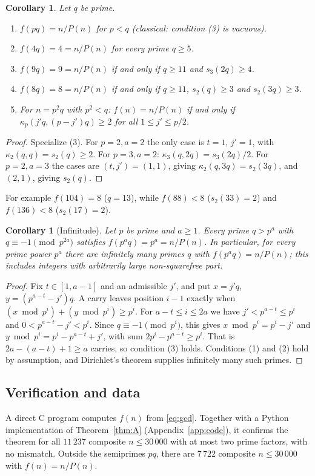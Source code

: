 \documentclass[11pt,a4paper]{article}
\newtheorem{corollary}[theorem]{Corollary}
\theoremstyle{definition}
\begin{document}
\begin{corollary}\label{cor:small}
Let $q$ be prime.
\begin{enumerate}
\item $f(pq)=n/P(n)$ for $p<q$ (classical: condition (3) is vacuous).
\item $f(4q)=4=n/P(n)$ for every prime $q\ge5$.
\item $f(9q)=9=n/P(n)$ if and only if $q\ge11$ and $s_3(2q)\ge4$.
\item $f(8q)=8=n/P(n)$ if and only if $q\ge11$, $s_2(q)\ge3$ and $s_2(3q)\ge3$.
\item For $n=p^2q$ with $p^2<q$: $f(n)=n/P(n)$ if and only if
  $\kappa_p(j'q,(p-j')q)\ge2$ for all $1\le j'\le p/2$.
\end{enumerate}
\end{corollary}
\begin{proof}
Specialize (3). For $p=2,a=2$ the only case is $t=1$, $j'=1$, with
$\kappa_2(q,q)=s_2(q)\ge2$. For $p=3,a=2$: $\kappa_3(q,2q)=s_3(2q)/2$. For $p=2,a=3$ the
cases are $(t,j')=(1,1)$, giving $\kappa_2(q,3q)=s_2(3q)$, and $(2,1)$, giving $s_2(q)$.
\end{proof}

For example $f(104)=8$ ($q=13$), while $f(88)<8$ ($s_2(33)=2$) and $f(136)<8$
($s_2(17)=2$).

\begin{corollary}[Infinitude]\label{cor:infinite}
Let $p$ be prime and $a\ge1$. Every prime $q>p^a$ with $q\equiv-1\pmod{p^{2a}}$ satisfies
$f(p^aq)=p^a=n/P(n)$. In particular, for every prime power $p^a$ there are infinitely many
primes $q$ with $f(p^aq)=n/P(n)$; this includes integers with arbitrarily large non-squarefree
part.
\end{corollary}
\begin{proof}
Fix $t\in[1,a-1]$ and an admissible $j'$, and put $x=j'q$, $y=(p^{a-t}-j')q$. A carry leaves
position $i-1$ exactly when $(x\bmod p^i)+(y\bmod p^i)\ge p^i$. For $a-t\le i\le 2a$ we
have $j'<p^{a-t}\le p^i$ and $0<p^{a-t}-j'<p^i$. Since $q\equiv-1\pmod{p^i}$, this gives
$x\bmod p^i=p^i-j'$ and $y\bmod p^i=p^i-p^{a-t}+j'$, with sum $2p^i-p^{a-t}\ge p^i$. That is
$2a-(a-t)+1\ge a$ carries, so condition (3) holds. Conditions (1) and (2) hold by
assumption, and Dirichlet's theorem supplies infinitely many such primes.
\end{proof}

\subsection{Verification and data}
A direct C program computes $f(n)$ from \eqref{eq:gcd}. Together with a Python
implementation of Theorem~\ref{thm:A} (Appendix~\ref{app:code}), it confirms the theorem for
all $11\,237$ composite $n\le30\,000$ with at most two prime factors, with no mismatch.
Outside the semiprimes $pq$, there are $7\,722$ composite $n\le30\,000$ with
$f(n)=n/P(n)$.
\end{document}
